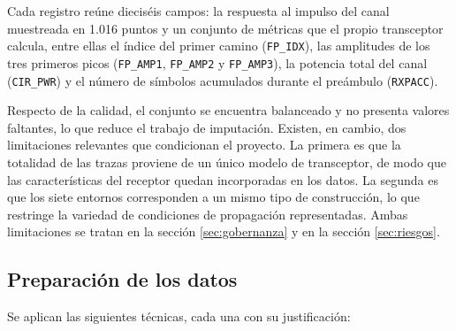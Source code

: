\documentclass[
11pt, %
]{charter}
\begin{document}
Cada registro reúne dieciséis campos: la respuesta al impulso del canal muestreada en 1.016 puntos y un conjunto de métricas que el propio transceptor calcula, entre ellas el índice del primer camino (\texttt{FP\_IDX}), las amplitudes de los tres primeros picos (\texttt{FP\_AMP1}, \texttt{FP\_AMP2} y \texttt{FP\_AMP3}), la potencia total del canal (\texttt{CIR\_PWR}) y el número de símbolos acumulados durante el preámbulo (\texttt{RXPACC}).

Respecto de la calidad, el conjunto se encuentra balanceado y no presenta valores faltantes, lo que reduce el trabajo de imputación. Existen, en cambio, dos limitaciones relevantes que condicionan el proyecto. La primera es que la totalidad de las trazas proviene de un único modelo de transceptor, de modo que las características del receptor quedan incorporadas en los datos. La segunda es que los siete entornos corresponden a un mismo tipo de construcción, lo que restringe la variedad de condiciones de propagación representadas. Ambas limitaciones se tratan en la sección \ref{sec:gobernanza} y en la sección \ref{sec:riesgos}.

\subsection{Preparación de los datos}

Se aplican las siguientes técnicas, cada una con su justificación:
\end{document}
